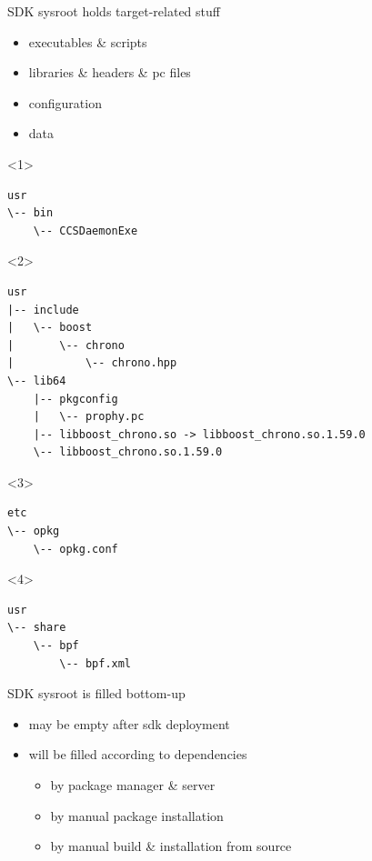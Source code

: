 \documentclass{beamer}
\begin{document}
\begin{frame}[fragile, t]{SDK sysroot holds target-related stuff}
    \begin{block}{}
        \begin{itemize}
            \item<1->{executables \& scripts}
            \item<2->{libraries \& headers \& pc files}
            \item<3->{configuration}
            \item<4->{data}
        \end{itemize}
    \end{block}
    \begin{onlyenv}<1>
\begin{lstlisting}[style=Console]
usr
\-- bin
    \-- CCSDaemonExe
\end{lstlisting}
    \end{onlyenv}
    \begin{onlyenv}<2>
\begin{lstlisting}[style=Console]
usr
|-- include
|   \-- boost
|       \-- chrono
|           \-- chrono.hpp
\-- lib64
    |-- pkgconfig
    |   \-- prophy.pc
    |-- libboost_chrono.so -> libboost_chrono.so.1.59.0
    \-- libboost_chrono.so.1.59.0
\end{lstlisting}
    \end{onlyenv}
    \begin{onlyenv}<3>
\begin{lstlisting}[style=Console]
etc
\-- opkg
    \-- opkg.conf
\end{lstlisting}
    \end{onlyenv}
    \begin{onlyenv}<4>
\begin{lstlisting}[style=Console]
usr
\-- share
    \-- bpf
        \-- bpf.xml
\end{lstlisting}
    \end{onlyenv}
\end{frame}

\begin{frame}{SDK sysroot is filled bottom-up}
    \begin{block}{}
        \begin{itemize}
            \item{may be empty after sdk deployment}
            \item{will be filled according to dependencies}
            \begin{itemize}
                \item{by package manager \& server}
                \item{by manual package installation}
                \item{by manual build \& installation from source}
            \end{itemize}
        \end{itemize}
    \end{block}
\end{frame}
\end{document}
